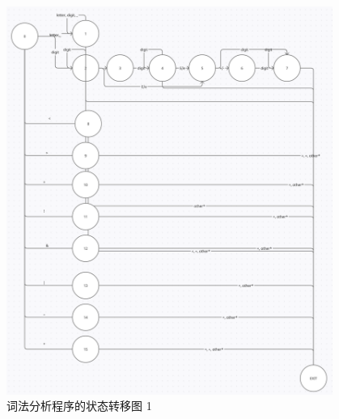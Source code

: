 \begin{figure}
  \begin{center}
    \includegraphics[width=0.95\textwidth]{figures/Page0.png}
  \end{center}
  \caption{词法分析程序的状态转移图 1}
  \label{fig:StateFig1}
\end{figure}

